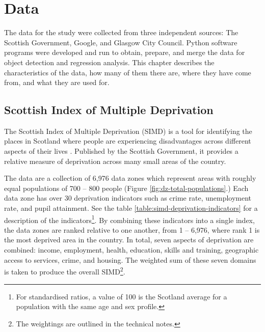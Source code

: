 \documentclass{thesis}
\begin{document}

\chapter{Data} \label{chapter:data}

The data for the study were collected from three independent sources: The Scottish Government, Google, and Glasgow City Council. Python software programs were developed and run to obtain, prepare, and merge the data for object detection and regression analysis. This chapter describes the characteristics of the data, how many of them there are, where they have come from, and what they are used for.

\section{Scottish Index of Multiple Deprivation}

The Scottish Index of Multiple Deprivation (SIMD) is a tool for identifying the places in Scotland where people are experiencing disadvantages across different aspects of their lives \cite{simd}. Published by the Scottish Government, it provides a relative measure of deprivation across many small areas of the country.

The data are a collection of 6,976 data zones which represent areas with roughly equal populations of 700 -- 800 people (Figure \ref{fig:dz-total-populations}.) Each data zone has over 30 deprivation indicators such as crime rate, unemployment rate, and pupil attainment. See the table \ref{table:simd-deprivation-indicators} for a description of the indicators\footnote{For standardised ratios, a value of 100 is the Scotland average for a population with the same age and sex profile.}. By combining these indicators into a single index, the data zones are ranked relative to one another, from 1 -- 6,976, where rank 1 is the most deprived area in the country. In total, seven aspects of deprivation are combined: income, employment, health, education, skills and training, geographic access to services, crime, and housing. The weighted sum of these seven domains is taken to produce the overall SIMD\footnote{The weightings are outlined in the technical notes\cite{simd-technical-notes}.}.
\end{document}
